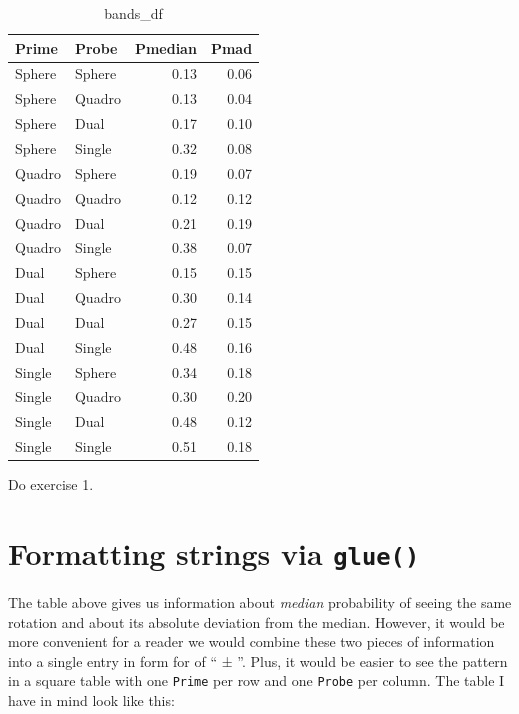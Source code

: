 \documentclass[
]{book}
\begin{document}
\begin{table}

\caption{\label{tab:unnamed-chunk-293}bands\_df}
\centering
\begin{tabular}[t]{l|l|r|r}
\hline
Prime & Probe & Pmedian & Pmad\\
\hline
Sphere & Sphere & 0.13 & 0.06\\
\hline
Sphere & Quadro & 0.13 & 0.04\\
\hline
Sphere & Dual & 0.17 & 0.10\\
\hline
Sphere & Single & 0.32 & 0.08\\
\hline
Quadro & Sphere & 0.19 & 0.07\\
\hline
Quadro & Quadro & 0.12 & 0.12\\
\hline
Quadro & Dual & 0.21 & 0.19\\
\hline
Quadro & Single & 0.38 & 0.07\\
\hline
Dual & Sphere & 0.15 & 0.15\\
\hline
Dual & Quadro & 0.30 & 0.14\\
\hline
Dual & Dual & 0.27 & 0.15\\
\hline
Dual & Single & 0.48 & 0.16\\
\hline
Single & Sphere & 0.34 & 0.18\\
\hline
Single & Quadro & 0.30 & 0.20\\
\hline
Single & Dual & 0.48 & 0.12\\
\hline
Single & Single & 0.51 & 0.18\\
\hline
\end{tabular}
\end{table}

Do exercise 1.

\hypertarget{glue}{%
\section{\texorpdfstring{Formatting strings via \texttt{glue()}}{Formatting strings via glue()}}\label{glue}}

The table above gives us information about \emph{median} probability of seeing the same rotation and about its absolute deviation from the median. However, it would be more convenient for a reader we would combine these two pieces of information into a single entry in form for of `` ± ''. Plus, it would be easier to see the pattern in a square table with one \texttt{Prime} per row and one \texttt{Probe} per column. The table I have in mind look like this:
\end{document}
